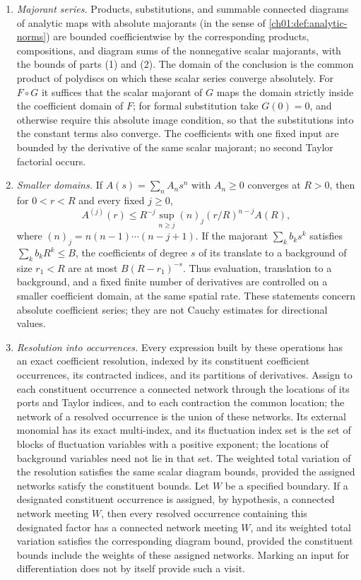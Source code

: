 \begin{lemma}
\begin{enumerate}
\item \emph{Majorant series.} Products, substitutions, and summable connected diagrams of analytic maps with absolute majorants (in the sense of \cref{ch01:def:analytic-norms}) are bounded coefficientwise by the corresponding products, compositions, and diagram sums of the nonnegative scalar majorants, with the bounds of parts (1) and (2). The domain of the conclusion is the common product of polydiscs on which these scalar series converge absolutely. For $F\circ G$ it suffices that the scalar majorant of $G$ maps the domain strictly inside the coefficient domain of $F$; for formal substitution take $G(0)=0$, and otherwise require this absolute image condition, so that the substitutions into the constant terms also converge. The coefficients with one fixed input are bounded by the derivative of the same scalar majorant; no second Taylor factorial occurs.
\item \emph{Smaller domains.} If $A(s)=\sum_nA_ns^n$ with $A_n\ge0$ converges at $R>0$, then for $0<r<R$ and every fixed $j\ge0$,
\[
 A^{(j)}(r)\le R^{-j}\sup_{n\ge j}(n)_j(r/R)^{n-j}A(R),
\]
where $(n)_j=n(n-1)\cdots(n-j+1)$. If the majorant $\sum_kb_ks^k$ satisfies $\sum_kb_kR^k\le B$, the coefficients of degree $s$ of its translate to a background of size $r_1<R$ are at most $B(R-r_1)^{-s}$. Thus evaluation, translation to a background, and a fixed finite number of derivatives are controlled on a smaller coefficient domain, at the same spatial rate. These statements concern absolute coefficient series; they are not Cauchy estimates for directional values.
\item \emph{Resolution into occurrences.} Every expression built by these operations has an exact coefficient resolution, indexed by its constituent coefficient occurrences, its contracted indices, and its partitions of derivatives. Assign to each constituent occurrence a connected network through the locations of its ports and Taylor indices, and to each contraction the common location; the network of a resolved occurrence is the union of these networks. Its external monomial has its exact multi-index, and its fluctuation index set is the set of blocks of fluctuation variables with a positive exponent; the locations of background variables need not lie in that set. The weighted total variation of the resolution satisfies the same scalar diagram bounds, provided the assigned networks satisfy the constituent bounds. Let $W$ be a specified boundary. If a designated constituent occurrence is assigned, by hypothesis, a connected network meeting $W$, then every resolved occurrence containing this designated factor has a connected network meeting $W$, and its weighted total variation satisfies the corresponding diagram bound, provided the constituent bounds include the weights of these assigned networks. Marking an input for differentiation does not by itself provide such a visit.

\end{enumerate}
\end{lemma}
